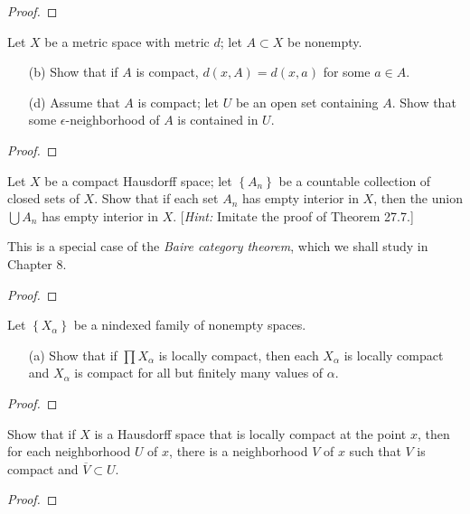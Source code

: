 \begin{proof}

\end{proof}
\newpage
\begin{problem}[Munkres \S27, Ex.\,2(b,d)]
Let $X$ be a metric space with metric $d$; let $A\subset X$ be
nonempty.
\begin{itemize}
\item[(b)] Show that if $A$ is compact, $d(x,A)=d(x,a)$ for some
  $a\in A$.
\item[(d)] Assume that $A$ is compact; let $U$ be an open set
  containing $A$. Show that some $\epsilon$-neighborhood of $A$
  is contained in $U$.
\end{itemize}
\end{problem}
\begin{proof}
\end{proof}
\newpage
\begin{problem}[Munkres \S27, Ex.\,5]
Let $X$ be a compact Hausdorff space; let $\left\{A_n\right\}$ be
a countable collection of closed sets of $X$. Show that if each
set $A_n$ has empty interior in $X$, then the union $\bigcup A_n$
has empty interior in $X$. [\emph{Hint:} Imitate the proof of
Theorem 27.7.]

This is a special case of the \emph{Baire category theorem},
which we shall study in Chapter 8.
\end{problem}
\begin{proof}
\end{proof}
\newpage
\begin{problem}[Munkres \S28, Ex.\,2(a)]
Let $\left\{X_\alpha\right\}$ be a nindexed family of nonempty
spaces.
\begin{itemize}
\item[(a)] Show that if $\prod X_\alpha$ is locally compact, then
  each $X_\alpha$ is locally compact and $X_\alpha$ is compact
  for all but finitely many values of $\alpha$.
\end{itemize}
\end{problem}
\begin{proof}
\end{proof}
\newpage
\begin{problem}[Munkres \S28, Ex.\,10]
Show that if $X$ is a Hausdorff space that is locally compact at
the point $x$, then for each neighborhood $U$ of $x$, there is a
neighborhood $V$ of $x$ such that $V$ is compact and $\overline
V\subset U$.
\end{problem}
\begin{proof}
\end{proof}
